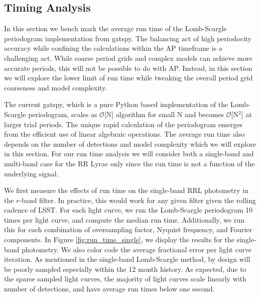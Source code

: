\documentclass[DM,authoryear,toc]{lsstdoc}
\begin{document}
\subsection{Timing Analysis}

In this section we bench mark the average run time of the Lomb-Scargle periodogram implementation from gatspy. The balancing act of high periodocity accuracy while confining the calculations within the AP timeframe is a challenging act. While coarse period grids  and complex models can achieve more accurate periods, this will not be possible to do with AP. Instead, in this section we will explore the lower limit of run time while tweaking the overall period grid coarseness and model complexity.

The current gatspy, which is a pure Python based implementation of the Lomb-Scargle periodogram, scales as  $\mathcal{O}$[N] algorithm for small N and becomes $\mathcal{O}$[N$^2$] at larger trial periods. The unique rapid calculation of the periodogram emerges from the efficient use of linear algebraic operations. The average run time also depends on the number of detections and model complexity which we will explore in this section. For our run time analysis we will consider both a single-band and multi-band case for the RR Lyrae only since the run time is not a function of the underlying signal. 

We first measure the effects of run time on the single-band RRL photometry in the $r$-band filter. In practice, this would work for any given filter given the rolling cadence of LSST. For each light curve, we run the Lomb-Scargle periodogram 10 times per light curve, and compute the median run time. Additionally, we run this for each combination of oversampling factor, Nyquist frequency, and Fourier components. In Figure \ref{fig:run_time_single}, we display the results for the single-band photometry. We also color code the average fractional error per light curve iteration. As mentioned in the single-band Lomb-Scargle method, by design will be poorly sampled especially within the 12 month history. As expected, due to the sparse sampled light curves, the majority of light curves scale linearly with number of detections, and have average run times below one second. 
\end{document}
